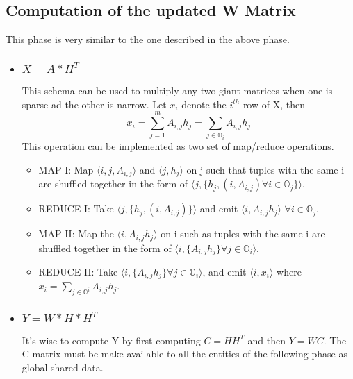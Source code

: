 \documentclass[a4paper,12pt]{article}
\begin{document}
	
	\subsection{Computation of the updated W Matrix}
    This phase is very similar to the one described in the above
    phase.

    \begin{itemize}
      \item \subsubsection{$ X = A * H^T $}
        This schema can be used to multiply any two giant matrices when one
        is sparse ad the other is narrow. Let $x_i$ denote the $i^{th}$ row of X, then 
        $$ x_i = \sum_{j=1}^{m} A_{i,j} h_{j} = \sum_{j \in \mathbb{O}_i} A_{i,j} h_{j} $$
        This operation can be implemented as two set of map/reduce
        operations.
        \begin{itemize}
          \item MAP-I: Map $ \langle i, j, A_{i,j} \rangle $ and $\langle j, h_j \rangle$ on j
            such that tuples with the same i are shuffled together in
            the form of  $ \langle j, \{h_{j}, (i, A_{i,j}) \forall i \in \mathbb{O}_j \} \rangle$.

         \item REDUCE-I: Take  $ \langle j, \{h_{j}, (i, A_{i,j}) \}
           \rangle$ and emit  $ \langle i, A_{i,j}  h_{j} \rangle$ $\forall i \in \mathbb{O}_j $.

          \item MAP-II: Map the $ \langle i, A_{i,j}  h_{j} \rangle$ on i such as tuples with the 
            same i are shuffled together in the form of $ \langle i, \{A_{i,j}  h_{j} \}
           \forall j \in \mathbb{O}_i \rangle$.

          \item REDUCE-II: Take $ \langle i, \{A_{i,j}  h_{j} \}
           \forall j \in \mathbb{O}_i \rangle$, and emit $\langle i,
           x_i \rangle$ where $ x_i = \sum_{j \in \mathbb{O}^i} A_{i,j}  h_{j} $.

         \end{itemize}

     \item \subsubsection{$ Y = W * H * H^T $}
       It's wise to compute Y by first computing $C= H H^T$ and then
       $Y=WC$. The C matrix must be make available to all the entities
       of the following phase as global
       shared data.


\end{itemize}
\end{document}
